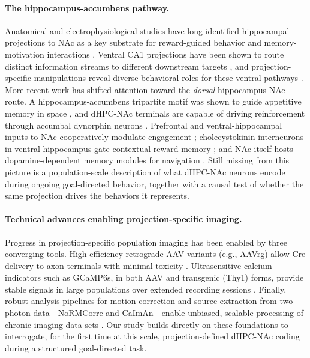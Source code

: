 \paragraph{The hippocampus-accumbens pathway.}
Anatomical and electrophysiological studies have long identified hippocampal projections to NAc as a key substrate for reward-guided behavior and memory-motivation interactions \citep{Mogenson1980Motivation,Britt2012Synaptic}. Ventral CA1 projections have been shown to route distinct information streams to different downstream targets \citep{Ciocchi2015Selective}, and projection-specific manipulations reveal diverse behavioral roles for these ventral pathways \citep{Bakoyiannis2023Pathway}. More recent work has shifted attention toward the \emph{dorsal} hippocampus-NAc route. A hippocampus-accumbens tripartite motif was shown to guide appetitive memory in space \citep{Trouche2019Place}, and dHPC-NAc terminals are capable of driving reinforcement through accumbal dynorphin neurons \citep{Ibrahim2024DorsalHPC}. Prefrontal and ventral-hippocampal inputs to NAc cooperatively modulate engagement \citep{Iyer2025Engagement}; cholecystokinin interneurons in ventral hippocampus gate contextual reward memory \citep{Nguyen2024Cholecystokinin}; and NAc itself hosts dopamine-dependent memory modules for navigation \citep{Jung2024Dopamine}. Still missing from this picture is a population-scale description of what dHPC-NAc neurons encode during ongoing goal-directed behavior, together with a causal test of whether the same projection drives the behaviors it represents.

\paragraph{Technical advances enabling projection-specific imaging.}
Progress in projection-specific population imaging has been enabled by three converging tools. High-efficiency retrograde AAV variants (e.g., AAVrg) allow Cre delivery to axon terminals with minimal toxicity \citep{Tervo2016AAVretro}. Ultrasensitive calcium indicators such as GCaMP6s, in both AAV and transgenic (Thy1) forms, provide stable signals in large populations over extended recording sessions \citep{Chen2013GCaMP6,Dana2014Thy1GCaMP6}. Finally, robust analysis pipelines for motion correction and source extraction from two-photon data---NoRMCorre and CaImAn---enable unbiased, scalable processing of chronic imaging data sets \citep{Pnevmatikakis2017NoRMCorre,Giovannucci2019CaImAn}. Our study builds directly on these foundations to interrogate, for the first time at this scale, projection-defined dHPC-NAc coding during a structured goal-directed task.

